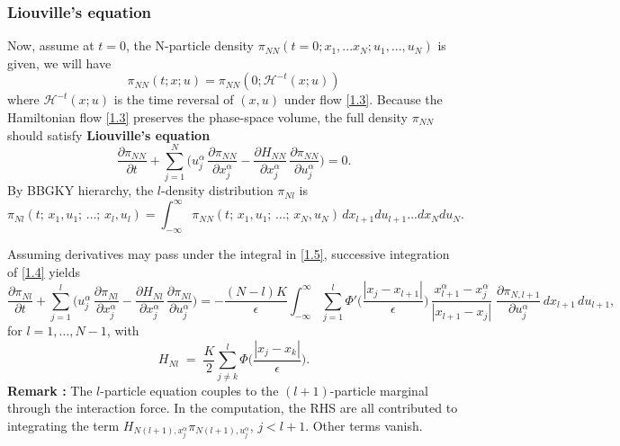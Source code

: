 \documentclass[11pt]{article}
\begin{document}
\subsubsection{Liouville's equation}
Now, assume at $t=0$, the N-particle density $\pi_{NN}(t=0;x_1,...x_N;u_1,...,u_N)$ is given, we will have\[
\pi_{NN}(t;x;u)=\pi_{NN}(0;\mathcal{H}^{-t}(x;u))
\]
where $\mathcal{H}^{-t}(x;u)$ is the time reversal of $(x,u)$ under flow \eqref{1.3}. 
Because the Hamiltonian flow \eqref{1.3} preserves the phase-space volume, the full density $\pi_{NN}$ should satisfy \textbf{Liouville's equation}
\begin{equation}\label{1.4}\tag{1.4}
    \frac{\partial \pi_{NN}}{\partial t}
+
\sum_{j=1}^N
\big(
u_j^\alpha\,\frac{\partial \pi_{NN}}{\partial x_j^\alpha}
-
\frac{\partial H_{NN}}{\partial x_j^\alpha}\,\frac{\partial \pi_{NN}}{\partial u_j^\alpha}
\big)
=0.
\end{equation}
By BBGKY hierarchy, the $l$-density distribution $\pi_{Nl}$ is 
\begin{equation}\label{1.5}\tag{1.5}
    \pi_{Nl}(t;\,x_1,u_1;\,\dots;\,x_l,u_l)
=
\int_{-\infty}^{\infty}
\pi_{NN}(t;\,x_1,u_1;\,\dots;\,x_{N},u_{N})\,dx_{l+1}du_{l+1}...dx_Ndu_N.
\end{equation}

Assuming derivatives may pass under the integral in \eqref{1.5}, successive integration of \eqref{1.4} yields
\begin{equation*}\label{1.6}
\frac{\partial\pi_{Nl}}{\partial t}
+
\sum_{j=1}^l
\big(
u_j^\alpha\,\frac{\partial\pi_{Nl}}{\partial x_j^\alpha}
-
\frac{\partial H_{Nl}}{\partial x^\alpha_j}\,\frac{\partial\pi_{Nl}}{\partial u_j^\alpha}
\big)
=
-\frac{(N-l)K}{\epsilon}
\int_{-\infty}^{\infty}
\sum_{j=1}^l
\Phi'\!\big(\frac{|x_j-x_{l+1}|}{\epsilon}\big)\,
\frac{x_{l+1}^\alpha-x_j^\alpha}{|x_{l+1}-x_j|}
\;
\frac{\partial\pi_{N,l+1}}{\partial u_j^\alpha}\,dx_{l+1}\,du_{l+1},
\tag{1.6}
\end{equation*}
for $l=1,\dots,N-1$, with
\[
H_{Nl} \;=\; \frac{K}{2}\sum_{j\neq k}^l \Phi\!\big(\frac{|x_j-x_k|}{\epsilon}\big).
\]
\textbf{Remark :} The $l$-particle equation couples to the $(l+1)$-particle marginal through the interaction force. In the computation, the RHS are all contributed to integrating the term $H_{N(l+1),x_j^\alpha} \pi_{N(l+1),u_j^\alpha}$, $j<l+1$. Other terms vanish.
\end{document}
